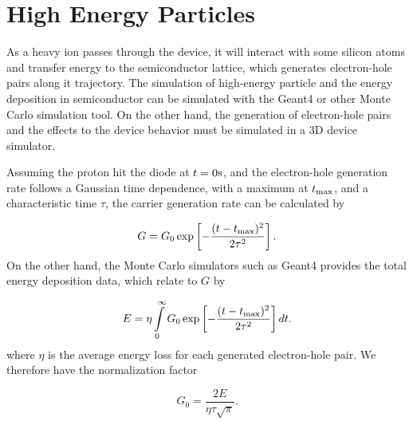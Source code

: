 \documentclass[oneside,12pt]{cgd_book}
\begin{document}
\section{High Energy Particles}
As a heavy ion passes through the device, it will interact with some silicon atoms and transfer energy to
      the semiconductor lattice, which generates electron-hole pairs along it trajectory. The simulation of high-energy
      particle and the energy deposition in semiconductor can be simulated with the Geant4 or other Monte Carlo
      simulation tool. On the other hand, the generation of electron-hole pairs and the effects to the device behavior
      must be simulated in a 3D device simulator.
\par
Assuming the proton hit the diode at $t=0\text{s}$, and the electron-hole
      generation rate follows a Gaussian time dependence, with a maximum at
$t_{\rm max}$,
      and a characteristic time $\tau$, the carrier generation rate can be calculated
      by
\par
\begin{equation}
G = G_0 \exp \left[ -\frac{(t-t_{\rm max})^2}{2\tau^2} \right] .
\end{equation}
On the other hand, the Monte Carlo simulators such as Geant4 provides the total energy deposition data,
      which relate to $G$ by
\par
\begin{equation}
\label{eq:Particle:E}
E = \eta \int\limits_0^{\infty} G_0 \exp \left[ -\frac{(t-t_{\rm max})^2}{2\tau^2} \right]
        dt.
\end{equation}
where $\eta$ is the average energy loss for each generated electron-hole pair.
      We therefore have the normalization factor
\par
\begin{equation}
\label{eq:Particle:G0}
G_0 = \frac{2E}{\eta \tau \sqrt{\pi}} .
\end{equation}
\end{document}
